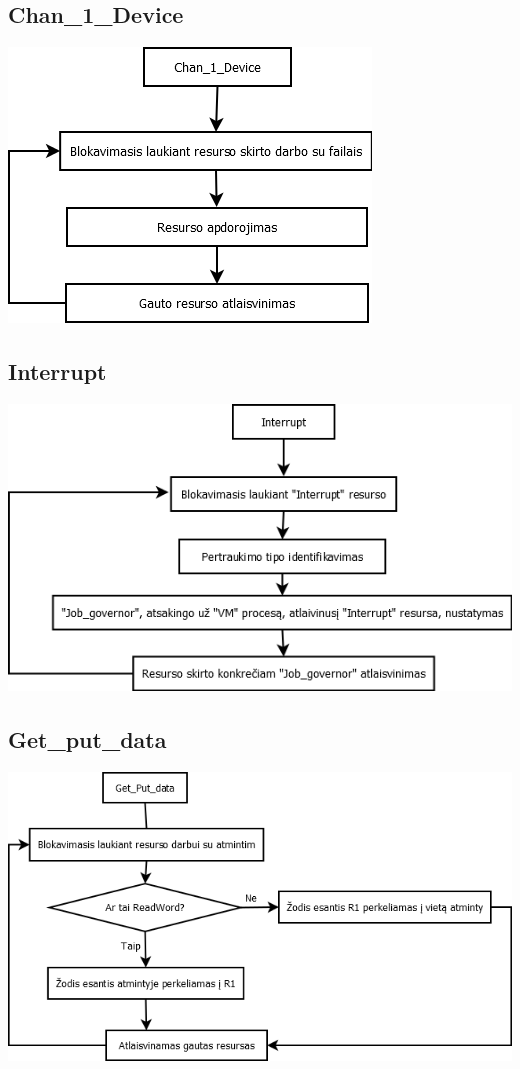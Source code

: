 	\subsection{Chan\_1\_Device}
		\begin{center}
			\includegraphics[scale=0.9]{diagramos/chan1Device.png}
		\end{center}
	\subsection{Interrupt}
		\begin{center}
			\includegraphics[scale=0.9]{diagramos/interrupt.png}
		\end{center}
	\subsection{Get\_put\_data}
		\begin{center}
			\includegraphics[scale=0.7]{diagramos/getPutData.png}
		\end{center}
